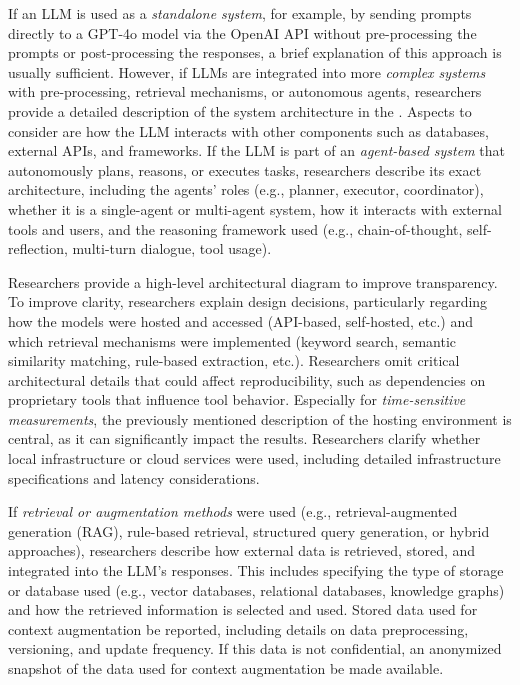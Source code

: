 If an LLM is used as a \emph{standalone system}, for example, by sending prompts directly to a GPT-4o model via the OpenAI API without pre-processing the prompts or post-processing the responses, a brief explanation of this approach is usually sufficient.
However, if LLMs are integrated into more \emph{complex systems} with pre-processing, retrieval mechanisms, or autonomous agents, researchers \must provide a detailed description of the system architecture in the \paper.
Aspects to consider are how the LLM interacts with other components such as databases, external APIs, and frameworks.
If the LLM is part of an \emph{agent-based system} that autonomously plans, reasons, or executes tasks, researchers \must describe its exact architecture, including the agents' roles (e.g., planner, executor, coordinator), whether it is a single-agent or multi-agent system, how it interacts with external tools and users, and the reasoning framework used (e.g., chain-of-thought, self-reflection, multi-turn dialogue, tool usage).

Researchers \should provide a high-level architectural diagram to improve transparency.
To improve clarity, researchers \should explain design decisions, particularly regarding how the models were hosted and accessed (API-based, self-hosted, etc.) and which retrieval mechanisms were implemented (keyword search, semantic similarity matching, rule-based extraction, etc.).
Researchers \mustnot omit critical architectural details that could affect reproducibility, such as dependencies on proprietary tools that influence tool behavior. 
Especially for \emph{time-sensitive measurements}, the previously mentioned description of the hosting environment is central, as it can significantly impact the results.
Researchers \must clarify whether local infrastructure or cloud services were used, including detailed infrastructure specifications and latency considerations.

If \emph{retrieval or augmentation methods} were used (e.g., retrieval-augmented generation (RAG), rule-based retrieval, structured query generation, or hybrid approaches), researchers \must describe how external data is retrieved, stored, and integrated into the LLM's responses.
This includes specifying the type of storage or database used (e.g., vector databases, relational databases, knowledge graphs) and how the retrieved information is selected and used.
Stored data used for context augmentation \must be reported, including details on data preprocessing, versioning, and update frequency.
If this data is not confidential, an anonymized snapshot of the data used for context augmentation \should be made available.

